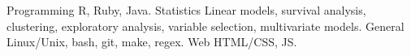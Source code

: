 


\begin{cvskills}

\cvskill
{Programming} %
{R, Ruby, Java.} %
\cvskill
{Statistics} %
{Linear models, survival analysis, clustering, exploratory analysis, 
variable selection, multivariate models.} %
\cvskill
{General} %
{Linux/Unix, bash, git, make, regex.} %
\cvskill
{Web} %
{HTML/CSS, JS.} %

\end{cvskills}
